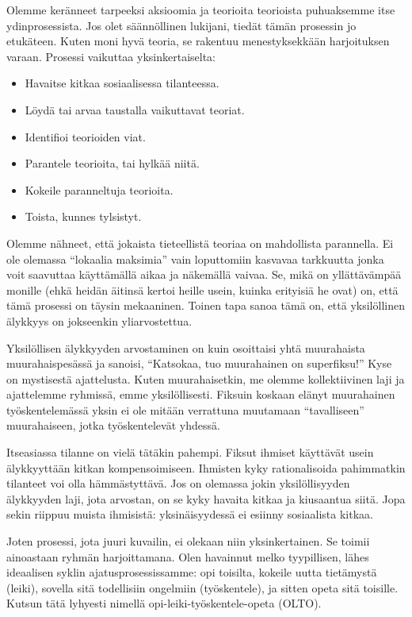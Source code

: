 Olemme keränneet tarpeeksi aksioomia ja teorioita teorioista puhuaksemme itse ydinprosessista. Jos olet säännöllinen lukijani, tiedät tämän prosessin jo etukäteen. Kuten moni hyvä teoria, se rakentuu menestyksekkään harjoituksen varaan. Prosessi vaikuttaa yksinkertaiselta:
\begin{itemize}
\item Havaitse kitkaa sosiaalisessa tilanteessa.
\item Löydä tai arvaa taustalla vaikuttavat teoriat.
\item Identifioi teorioiden viat.
\item Parantele teorioita, tai hylkää niitä.
\item Kokeile paranneltuja teorioita.
\item Toista, kunnes tylsistyt.
\end{itemize}
Olemme nähneet, että jokaista tieteellistä teoriaa on mahdollista parannella. Ei ole olemassa ``lokaalia maksimia\vmq{,}'' vain loputtomiin kasvavaa tarkkuutta jonka voit saavuttaa käyttämällä aikaa ja näkemällä vaivaa. Se, mikä on yllättävämpää monille (ehkä heidän äitinsä kertoi heille usein, kuinka erityisiä he ovat) on, että tämä prosessi on täysin mekaaninen. Toinen tapa sanoa tämä on, että yksilöllinen älykkyys on jokseenkin yliarvostettua.

Yksilöllisen älykkyyden arvostaminen on kuin osoittaisi yhtä muurahaista muurahaispesässä ja sanoisi, ``Katsokaa, tuo muurahainen on superfiksu!'' Kyse on mystisestä ajattelusta. Kuten muurahaisetkin, me olemme kollektiivinen laji ja ajattelemme ryhmissä, emme yksilöllisesti. Fiksuin koskaan elänyt muurahainen työskentelemässä yksin ei ole mitään verrattuna muutamaan ``tavalliseen'' muurahaiseen, jotka työskentelevät yhdessä.

Itseasiassa tilanne on vielä tätäkin pahempi. Fiksut ihmiset käyttävät usein älykkyyttään kitkan kompensoimiseen. Ihmisten kyky rationalisoida pahimmatkin tilanteet voi olla hämmästyttävä. Jos on olemassa jokin yksilöllisyyden älykkyyden laji, jota arvostan, on se kyky havaita kitkaa ja kiusaantua siitä. Jopa sekin riippuu muista ihmisistä: yksinäisyydessä ei esiinny sosiaalista kitkaa.

Joten prosessi, jota juuri kuvailin, ei olekaan niin yksinkertainen. Se toimii ainoastaan ryhmän harjoittamana. Olen havainnut melko tyypillisen, lähes ideaalisen syklin ajatusprosessissamme: opi toisilta, kokeile uutta tietämystä (leiki), sovella sitä todellisiin ongelmiin (työskentele), ja sitten opeta sitä toisille. Kutsun tätä lyhyesti nimellä opi-leiki-työskentele-opeta (OLTO).

